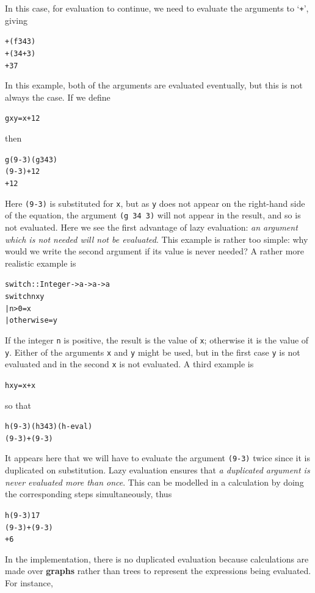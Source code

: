 In this case, for evaluation to continue, we need
to evaluate the arguments to `\texttt{+}', giving  
\begin{alltt}
+(f 34 3)
+(34+3) 
+37 
\end{alltt}
In this example, both of the arguments are evaluated eventually, but this is not
always the case. If we define
\begin{alltt}
g x y = x+12
\end{alltt}
then 
\begin{alltt}
g (9-3) (g 34 3)
\step (9-3)+12 
+12 
\end{alltt}
Here \texttt{(9-3)} is substituted for \texttt{x}, but as \texttt{y} does not appear
on the right-hand side of the equation, the argument \texttt{(g 34 3)} will
not appear in the result, and so is not evaluated. Here we see the first
advantage of lazy evaluation: \emph{an argument which is not needed will not be
evaluated}. This example is rather too simple: why would we write the second
argument if its value is never needed? A rather more realistic example is
\begin{alltt}
switch :: Integer -> a -> a -> a
switch n x y
  | n>0         = x
  | otherwise   = y
\end{alltt}
If the integer \texttt{n} is positive, the result is the value of
\texttt{x}; otherwise it is the value of
\texttt{y}. Either of
the arguments \texttt{x} and \texttt{y} might be used, but in the first
case \texttt{y} is not evaluated and in the second \texttt{x} is not
evaluated.
A third example is
\begin{alltt}
h x y = x+x
\end{alltt}
so that
\begin{alltt}
h (9-3) (h 34 3)\hfill (h-eval)
\step (9-3)+(9-3) 
\end{alltt}
It appears here that we will have to evaluate the argument \texttt{(9-3)}
twice since it is duplicated on substitution.
Lazy evaluation ensures that
\emph{a duplicated argument is never evaluated more than once}. This can be
modelled in a calculation by doing the corresponding steps simultaneously,
thus
\begin{alltt}
h (9-3) 17
\step (9-3)+(9-3) 
+6
\end{alltt}
In the implementation, there is no duplicated evaluation because
calculations are made over \textbf{graphs} 
rather than trees to represent the expressions being evaluated.
For instance,
